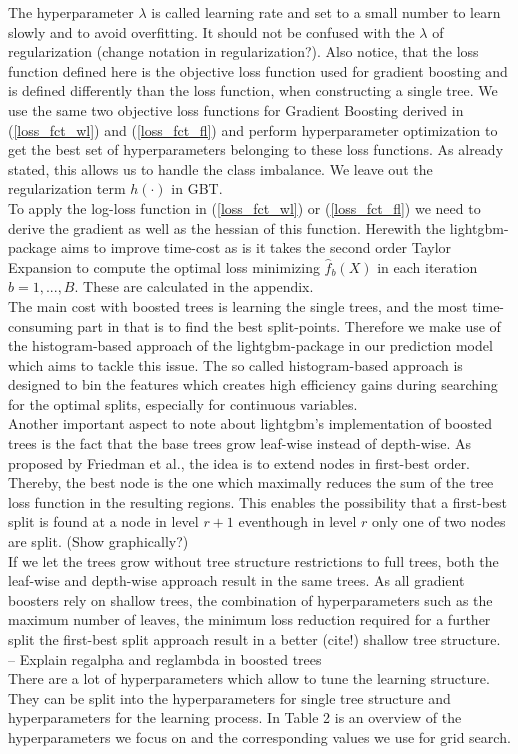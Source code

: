 \documentclass[12pt,titlepage]{article}
\begin{document}
The hyperparameter $\lambda$ is called learning rate and set to a small number to learn slowly and to avoid overfitting. It should not be confused with the $\lambda$ of regularization (change notation in regularization?). Also notice, that the loss function defined here is the objective loss function used for gradient boosting and is defined differently than the loss function, when constructing a single tree. We use the same two objective loss functions for Gradient Boosting derived in (\ref{loss_fct_wl}) and (\ref{loss_fct_fl}) and perform hyperparameter optimization to get the best set of hyperparameters belonging to these loss functions. As already stated, this allows us to handle the class imbalance. We leave out the regularization term $h(\cdot)$ in GBT.\\
To apply the log-loss function in (\ref{loss_fct_wl}) or (\ref{loss_fct_fl}) we need to derive the gradient as well as the hessian of this function. Herewith the lightgbm-package \cite{gbt} aims to improve time-cost as is it takes the second order Taylor Expansion to compute the optimal loss minimizing $\hat{f}_{b}(X)$ in each iteration $b=1,...,B$. These are calculated in the appendix. \\
The main cost with boosted trees is learning the single trees, and the most time-consuming part in that is to find the best split-points. Therefore we make use of the histogram-based approach of the lightgbm-package in our prediction model which aims to tackle this issue. The so called histogram-based approach is designed to bin the features which creates high efficiency gains during searching for the optimal splits, especially for continuous variables. \\
Another important aspect to note about lightgbm's implementation of boosted trees is the fact that the base trees grow leaf-wise instead of depth-wise. As proposed by Friedman et al., the idea is to extend nodes in first-best order. Thereby, the best node is the one which maximally reduces the sum of the tree loss function in the resulting regions. This enables the possibility that a first-best split is found at a node in level $r+1$ eventhough in level $r$ only one of two nodes are split. (Show graphically?) \\
If we let the trees grow without tree structure restrictions to full trees, both the leaf-wise and depth-wise approach result in the same trees. As all gradient boosters rely on shallow trees, the combination of hyperparameters such as the maximum number of leaves, the minimum loss reduction required for a further split the first-best split approach result in a better (cite!) shallow tree structure. \\
-- Explain regalpha and reglambda in boosted trees \\
There are a lot of hyperparameters which allow to tune the learning structure. They can be split into the hyperparameters for single tree structure and hyperparameters for the learning process. In Table 2 is an overview of the hyperparameters we focus on and the corresponding values we use for grid search. \\
\end{document}
